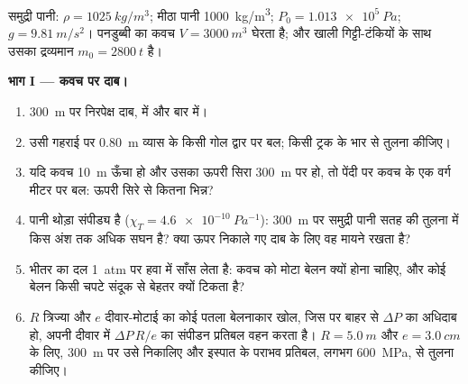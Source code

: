 \begin{problem}
\label{pb:b1:fluid-statics:1}
समुद्री पानी: $\rho = \qty{1025}{kg/m^3}$; मीठा पानी \qty{1000}{kg/m^3};
$P_0 = \qty{1.013e5}{Pa}$; $g = \qty{9.81}{m/s^2}$। पनडुब्बी का कवच
$V = \qty{3000}{m^3}$ घेरता है; और खाली गिट्टी-टंकियों के साथ उसका
द्रव्यमान $m_0 = \qty{2800}{t}$ है।

\medskip
\noindent\textbf{भाग I --- कवच पर दाब।}
\begin{enumerate}
  \item \qty{300}{m} पर निरपेक्ष दाब,  में और बार में।
  \item उसी गहराई पर \qty{0.80}{m} व्यास के किसी गोल द्वार पर बल; किसी
        ट्रक के भार से तुलना कीजिए।
  \item यदि कवच \qty{10}{m} ऊँचा हो और उसका ऊपरी सिरा \qty{300}{m} पर हो,
        तो पेंदी पर कवच के एक वर्ग मीटर पर बल: ऊपरी सिरे से कितना भिन्न?
  \item पानी थोड़ा संपीड्य है ($\chi_T = \qty{4.6e-10}{Pa^{-1}}$):
        \qty{300}{m} पर समुद्री पानी सतह की तुलना में किस अंश तक अधिक सघन
        है? क्या ऊपर निकाले गए दाब के लिए वह मायने रखता है?
  \item भीतर का दल \qty{1}{atm} पर हवा में साँस लेता है: कवच को मोटा बेलन
        क्यों होना चाहिए, और कोई बेलन किसी चपटे संदूक से बेहतर क्यों टिकता
        है?
  \item $R$ त्रिज्या और $e$ दीवार-मोटाई का कोई पतला बेलनाकार खोल, जिस पर
        बाहर से $\Delta P$ का अधिदाब हो, अपनी दीवार में
        $\Delta P\,R/e$ का संपीडन प्रतिबल वहन करता है। $R = \qty{5.0}{m}$
        और $e = \qty{3.0}{cm}$ के लिए, \qty{300}{m} पर उसे निकालिए और
        इस्पात के पराभव प्रतिबल, लगभग \qty{600}{MPa}, से तुलना कीजिए।
\end{enumerate}


\end{problem}
